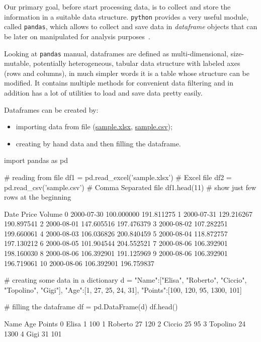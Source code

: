 Our primary goal, before start processing data, is to collect and store the information in a suitable data structure. \texttt{python} provides a very useful module, called \texttt{pandas}, which allows to collect and save data in \emph{dataframe} objects that can be later on manipulated for analysis purposes~\cite{pandas}.

Looking at \texttt{pandas} manual, dataframes are defined as multi-dimensional, size-mutable, potentially heterogeneous, tabular data structure with labeled axes (rows and columns), in much simpler words it is a table whose structure can be modified.
It contains multiple methods for convenient data filtering and in addition has a lot of utilities to load and 
save data pretty easily.

Dataframes can be created by:
\begin{itemize}
	\tightlist
\item importing data from file (\href{}{sample.xlsx}, \href{}{sample.csv});
\item creating by hand data and then filling the dataframe.
\end{itemize}

\begin{ipython}
import pandas as pd

# reading from file
df1 = pd.read_excel('sample.xlsx') # Excel file
df2 = pd.read_csv('sample.csv') # Comma Separated file
df1.head(11) # show just few rows at the beginning
\end{ipython}
\begin{ioutput}
         Date       Price      Volume
0  2000-07-30  100.000000  191.811275
1  2000-07-31  129.216267  190.897541
2  2000-08-01  147.605516  197.476379
3  2000-08-02  107.282251  199.660061
4  2000-08-03  106.036826  200.840459
5  2000-08-04  118.872757  197.130212
6  2000-08-05  101.904544  204.552521
7  2000-08-06  106.392901  198.160030
8  2000-08-06  106.392901  191.125969
9  2000-08-06  106.392901  196.719061
10 2000-08-06  106.392901  196.759837
\end{ioutput}

\begin{ipython}
# creating some data in a dictionary
d = {"Name":["Elisa", "Roberto", "Ciccio", "Topolino", "Gigi"],
	 "Age":[1, 27, 25, 24, 31],
	 "Points":[100, 120, 95, 1300, 101]}

# filling the dataframe
df = pd.DataFrame(d)
df.head()
\end{ipython}
\begin{ioutput}
       Name  Age     Points
0     Elisa    1        100
1   Roberto   27        120
2    Ciccio   25         95
3  Topolino   24       1300
4      Gigi   31        101
\end{ioutput}


